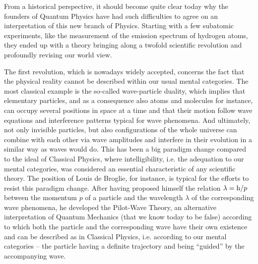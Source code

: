 \documentclass[10pt,a4paper,twoside,openany]{book}
\begin{document}
From a historical perspective, it should become quite clear today why the founders of Quantum Physics have had such difficulties to agree on an interpretation of this new branch of Physics. Starting with a few subatomic experiments, like the measurement of the emission spectrum of hydrogen atoms, they ended up with a theory bringing along a twofold scientific revolution and profoundly revising our world view.

The first revolution, which is nowadays widely accepted, concerns the fact that the physical reality cannot be described within our usual mental categories. The most classical example is the so-called wave-particle duality, which implies that elementary particles, and as a consequence also atoms and molecules for instance, can occupy several positions in space at a time and that their motion follow wave equations and interference patterns typical for wave phenomena. And ultimately, not only invisible particles, but also configurations of the whole universe can combine with each other via wave amplitudes and interfere in their evolution in a similar way as waves would do. This has been a big paradigm change compared to the ideal of Classical Physics, where intelligibility, i.e. the adequation to our mental categories, was considered an essential characteristic of any scientific theory. The position of Louis de Broglie, for instance, is typical for the efforts to resist this paradigm change. After having proposed himself the relation $\lambda = \mathrm h / p$ between the momentum $p$ of a particle and the wavelength $\lambda$ of the corresponding wave phenomena, he developed the Pilot-Wave Theory, an alternative interpretation of Quantum Mechanics (that we know today to be false) according to which both the particle and the corresponding wave have their own existence and can be described as in Classical Physics, i.e. according to our mental categories -- the particle having a definite trajectory and being ``guided'' by the accompanying wave.
\end{document}
